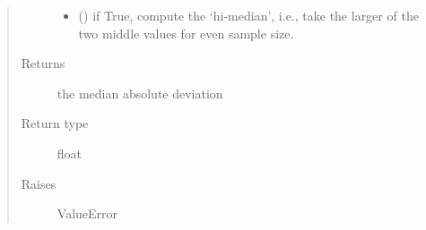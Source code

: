 \documentclass[letterpaper,10pt,english]{sphinxmanual}
\begin{document}
\begin{fulllineitems}
\begin{quote}
\begin{description}
\begin{itemize}
\item {} 
 () \textendash{} if True, compute the ‘hi-median’, i.e., take the larger of the two middle values for even sample size.

\end{itemize}

\item[{Returns}] \leavevmode
the median absolute deviation

\item[{Return type}] \leavevmode
float

\item[{Raises}] \leavevmode
ValueError

\end{description}\end{quote}

\end{fulllineitems}

\end{document}
